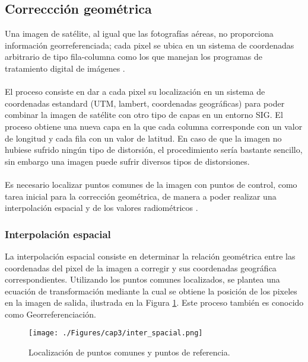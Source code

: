 \subsection{Correccci\'on geom\'etrica}\label{sec:corrGeometrica}
Una imagen de sat\'elite, al igual que las fotograf\'ias a\'ereas, no proporciona informaci\'on georreferenciada; cada pixel se ubica en un sistema de coordenadas arbitrario de tipo fila-columna como los que manejan los programas de tratamiento digital de im\'agenes \cite{deniseCultivos}.\\~\\
El proceso consiste en dar a cada pixel su localizaci\'on en un sistema de coordenadas estandard (UTM, lambert, coordenadas geogr\'aficas) para poder combinar la imagen de sat\'elite con otro tipo de capas en un entorno SIG. El proceso obtiene una nueva capa en la que cada columna corresponde con un valor de longitud y cada fila con un valor de latitud. En caso de que la imagen no hubiese sufrido ningún tipo de distorsi\'on, el procedimiento ser\'ia bastante sencillo, sin embargo una imagen puede sufrir diversos tipos de distorsiones.\\~\\
Es necesario localizar puntos comunes de la imagen con puntos de control, como tarea inicial para la correcci\'on geom\'etrica, de manera a poder realizar una interpolaci\'on espacial y de los valores radiom\'etricos \cite{deniseCultivos}.

\subsubsection{Interpolaci\'on espacial}
La interpolaci\'on espacial consiste en determinar la relaci\'on geom\'etrica entre las coordenadas del pixel de la imagen a corregir y sus coordenadas geogr\'afica correspondientes. Utilizando los puntos comunes localizados, se plantea una ecuaci\'on de transformaci\'on mediante la cual se obtiene la posici\'on de los pixeles en la imagen de salida, ilustrada en la Figura \ref{fig:intEspacial}. Este proceso tambi\'en es conocido como Georreferenciaci\'on.  
    \begin{figure}[H]
    	\centering
    	\texttt{[image: ./Figures/cap3/inter\_spacial.png]}
    	\caption{Localizaci\'on de puntos comunes y puntos de referencia.}
    	\label{fig:intEspacial}
    \end{figure}
    
